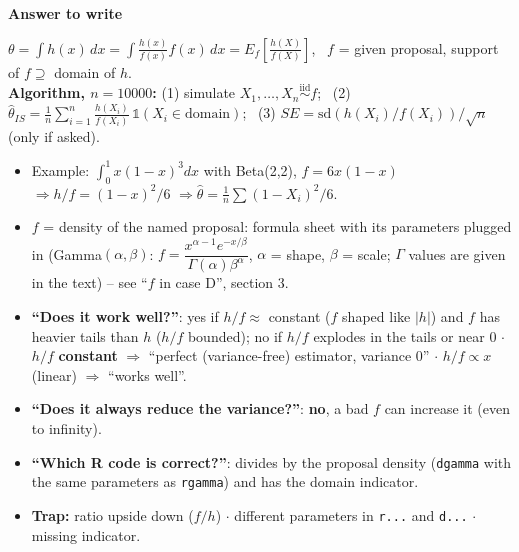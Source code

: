 \documentclass[10pt]{article}
\newcommand{\R}[1]{\texttt{#1}}
\newcommand{\trap}[1]{\textcolor{trap}{\textbf{Trap:} #1}}
\newcommand{\always}{\textcolor{always}{$\bullet$}}
\newcommand{\Q}[1]{\textbf{``#1''}}
\newcommand{\one}{\mathbb{1}}
\newcommand{\iid}{\overset{\text{iid}}{\sim}}
\renewcommand{\section}[1]{\par\vspace{8pt}{\large\bfseries\color{head}#1}\par\vspace{1pt}{\color{head}\hrule}\vspace{3pt}}
\newenvironment{answer}[1][Answer to write]{\par\vspace{2pt}\begin{shaded}\small\textbf{#1}\par\vspace{1pt}}{\end{shaded}\vspace{-2pt}}
\begin{document}
\begin{answer}
$\displaystyle\theta=\int h(x)\,dx=\int\frac{h(x)}{f(x)}f(x)\,dx=E_f\!\left[\frac{h(X)}{f(X)}\right]$, \ $f$ = given proposal, support of $f\supseteq$ domain of $h$.\\[2pt]
\textbf{Algorithm, $n=10000$:} (1) simulate $X_1,\dots,X_n\iid f$; \ (2) $\displaystyle\hat\theta_{IS}=\frac1n\sum_{i=1}^n\frac{h(X_i)}{f(X_i)}\,\one(X_i\in\text{domain})$; \ (3) $SE=\mathrm{sd}(h(X_i)/f(X_i))/\sqrt n$ (only if asked).
\end{answer}
\begin{itemize}
\item Example: $\int_0^1x(1-x)^3dx$ with Beta(2,2), $f=6x(1-x)$ $\Rightarrow h/f=(1-x)^2/6$ $\Rightarrow \hat\theta=\frac1n\sum(1-X_i)^2/6$.
\item \textbf{$f$} = density of the named proposal: formula sheet with its parameters plugged in (Gamma$(\alpha,\beta)$: $f=\dfrac{x^{\alpha-1}e^{-x/\beta}}{\Gamma(\alpha)\beta^\alpha}$, $\alpha$ = shape, $\beta$ = scale; $\Gamma$ values are given in the text) -- see ``$f$ in case D'', section 3.
\item \Q{Does it work well?}: yes if $h/f\approx$ constant ($f$ shaped like $|h|$) and $f$ has heavier tails than $h$ ($h/f$ bounded); no if $h/f$ explodes in the tails or near 0 $\cdot$ $h/f$ \textbf{constant} $\Rightarrow$ ``perfect (variance-free) estimator, variance 0'' $\cdot$ $h/f\propto x$ (linear) $\Rightarrow$ ``works well''.
\item \Q{Does it always reduce the variance?}: \textbf{no}, a bad $f$ can increase it (even to infinity).
\item \Q{Which R code is correct?}: divides by the proposal density (\R{dgamma} with the same parameters as \R{rgamma}) and has the domain indicator.
\item \trap{ratio upside down ($f/h$) $\cdot$ different parameters in \R{r...} and \R{d...} $\cdot$ missing indicator.}
\end{itemize}

\section{\always{} 5. Antithetic variables}
\end{document}
